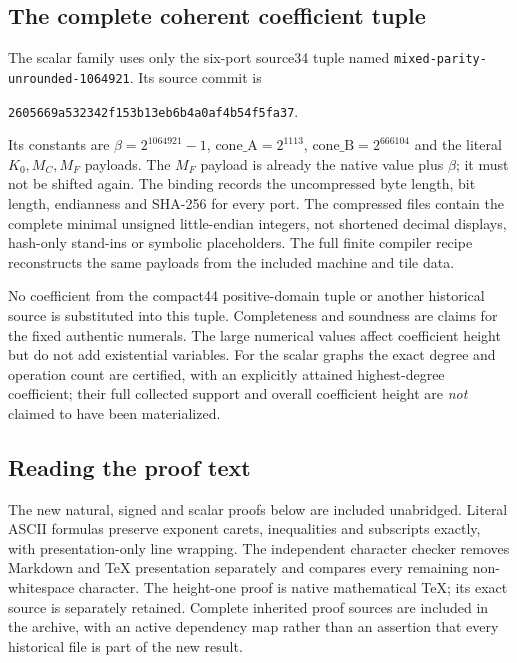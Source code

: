 \subsection{The complete coherent coefficient tuple}
The scalar family uses only the six-port source34 tuple named \texttt{mixed-parity-unrounded-1064921}. Its source commit is
\begin{center}\small\nolinkurl{2605669a532342f153b13eb6b4a0af4b54f5fa37}.\end{center}
Its constants are $\beta=2^{1064921}-1$, $\mathrm{cone\_A}=2^{1113}$, $\mathrm{cone\_B}=2^{666104}$ and the literal $K_0,M_C,M_F$ payloads. The $M_F$ payload is already the native value plus $\beta$; it must not be shifted again. The binding records the uncompressed byte length, bit length, endianness and SHA-256 for every port. The compressed files contain the complete minimal unsigned little-endian integers, not shortened decimal displays, hash-only stand-ins or symbolic placeholders. The full finite compiler recipe reconstructs the same payloads from the included machine and tile data.

No coefficient from the compact44 positive-domain tuple or another historical source is substituted into this tuple. Completeness and soundness are claims for the fixed authentic numerals. The large numerical values affect coefficient height but do not add existential variables. For the scalar graphs the exact degree and operation count are certified, with an explicitly attained highest-degree coefficient; their full collected support and overall coefficient height are \emph{not} claimed to have been materialized.

\subsection{Reading the proof text}
The new natural, signed and scalar proofs below are included unabridged. Literal ASCII formulas preserve exponent carets, inequalities and subscripts exactly, with presentation-only line wrapping. The independent character checker removes Markdown and TeX presentation separately and compares every remaining non-whitespace character. The height-one proof is native mathematical TeX; its exact source is separately retained. Complete inherited proof sources are included in the archive, with an active dependency map rather than an assertion that every historical file is part of the new result.
